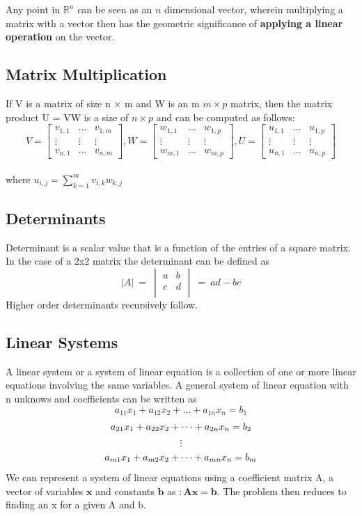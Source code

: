 \documentclass[12pt]{article}
\begin{document}
Any point in $\mathbb{R}^n$ can be seen as an $n$ dimensional vector, wherein multiplying a matrix with a vector then has the geometric significance of \textbf{applying a linear operation} on the vector.

\subsection{Matrix Multiplication}
\begin{definition}
If V is a matrix of size n $\times$ m and W is an m $m \times p$ matrix, then the matrix product U = VW is a size of $n \times p$ and can be computed as follows: 
$$V = \begin{bmatrix}
    v_{1,1} & \dots & v_{1,m} \\
    \vdots & \vdots & \vdots \\
    v_{n,1} & \dots & v_{n,m}
\end{bmatrix}
, 
W = \begin{bmatrix}
    w_{1,1} & \dots & w_{1,p} \\
    \vdots & \vdots & \vdots \\
    w_{m,1} & \dots & w_{m,p}
\end{bmatrix}
,
U = \begin{bmatrix}
    u_{1,1} & \dots & u_{1,p} \\
    \vdots & \vdots & \vdots \\
    u_{n,1} & \dots & u_{n,p}
\end{bmatrix}$$
\\
where $u_{i,j} = \sum_{k=1}^m v_{i,k}w_{k,j}$  
\end{definition}
\subsection{Determinants}
Determinant is a scalar value that is a function of the entries of a square matrix. In the case of a 2x2 matrix the determinant can be defined as 
$$
|A| \  = \ \begin{vmatrix}
a & b \\
c & d \\
\end{vmatrix}
\ =  \ ad - bc
$$
Higher order determinants recursively follow. 
\subsection{Linear Systems}
A linear system or a system of linear equation is a collection of one or more 
linear equations involving the same variables. A general system of linear equation with n unknows and coefficients can be written as \\
$$ a_{11}x_1 + a_{12}x_2 + \dots + a_{1n}x_n = b_1 $$
$$ a_{21}x_1 + a_{22}x_2 + \dots + a_{2n}x_n = b_2 \\ $$
$$\vdots $$
$$ a_{m1}x_1 + a_{m2}x_2 + \dots + a_{mn}x_n = b_m \\ $$
We can represent a system of linear equations using a coefficient matrix A, a vector of variables $\mathbf{x}$ and constants $\mathbf{b}$ as $: \mathbf{Ax = b}$. The problem then reduces to finding an x for a given A and b.
\end{document}
